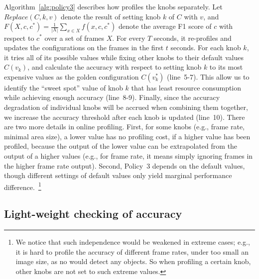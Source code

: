 Algorithm~\ref{alg:policy3} describes how \name profiles the knobs
separately. 
Let $Replace(C,k,v)$ denote the result of setting knob $k$ of $C$ 
with $v$, and $F(X,c,c^*)=\frac{1}{|X|}\sum_{x\in X}f(x,c,c^*)$ 
denote the average F1 score of $c$ with respect to $c^*$ over a 
set of frames $X$.
For every $T$ seconds, it re-profiles and updates the 
configurations on the frames in the first $t$ seconds.
For each knob $k$, it tries all of its possible values while 
fixing other knobs to their default values $C(v_k)$, and calculate
the accuracy with respect to setting knob $k$ to its most 
expensive values as the golden
configuration $C(v_k^*)$ (line~5-7). 
This allow us to identify the ``sweet spot'' value of knob $k$ 
that has least resource consumption while achieving enough 
accuracy (line~8-9).
Finally, since the accuracy degradation of individual knobs will 
be accrued when combining them together, we increase the accuracy 
threshold after each knob is updated (line~10).
There are two more details in online profiling.
First, for some knobs (e.g., frame rate, minimal area size), a
lower value has no profiling cost, if a higher value has been
profiled, because the output of the lower value can be extrapolated
from the output of a higher values (e.g., for frame rate, it means
simply ignoring frames in the higher frame rate output).
Second, Policy~3 depends on the default values, though different
settings of default values only yield marginal performance 
difference.~\footnote{We notice that such independence would be 
weakened in extreme cases; e.g., it is hard to profile the accuracy
of different frame rates, under too small an image size, as no \nn
would detect any objects. So when profiling a certain knob, other
knobs are not set to such extreme values.}


\subsection{Light-weight checking of accuracy}



